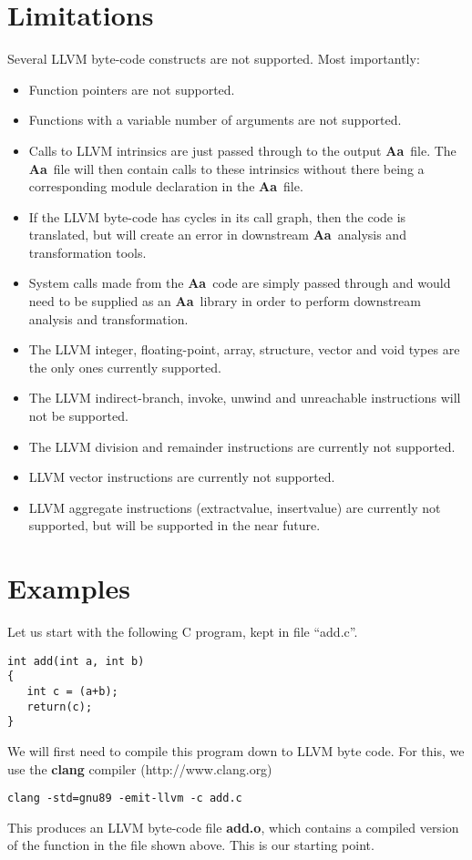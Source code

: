 \documentclass{article}
\newcommand{\Aa}{{\bf Aa}~}
\begin{document}
\section{Limitations}

Several LLVM byte-code constructs are not supported.  Most 
importantly:
\begin{itemize}
\item Function pointers are not supported.
\item Functions with a variable number of arguments are not 
supported.
\item Calls to LLVM intrinsics are just passed through to the
output \Aa file.  The \Aa file will then contain calls
to these intrinsics without there being a corresponding
module declaration in the \Aa file.
\item If the LLVM byte-code has cycles in its call graph,
then the code is translated, but will create an error
in downstream \Aa analysis and transformation tools.
\item System calls made from the \Aa code are simply
passed through and would need to be supplied as an
\Aa library in order to perform downstream analysis and
transformation.
\item The LLVM integer, floating-point, array, structure,
vector and void types are the only ones currently supported.
\item The LLVM indirect-branch, invoke, unwind and unreachable
instructions will not be supported.
\item The LLVM division and remainder instructions are currently
not supported. 
\item LLVM vector instructions are currently not supported.
\item LLVM aggregate instructions (extractvalue, insertvalue)
are currently not supported, but will be supported in the
near future.
\end{itemize}

\section{Examples}

Let us start with the following C program, kept
in file ``add.c''.
\begin{verbatim}
int add(int a, int b)
{
   int c = (a+b);
   return(c);
}
\end{verbatim}

We will first need to compile this program down to 
LLVM byte code.  For this, we use the {\bf clang}
compiler (http://www.clang.org)
\begin{verbatim}
clang -std=gnu89 -emit-llvm -c add.c
\end{verbatim}
This produces an LLVM byte-code file {\bf add.o},
which contains a compiled version of the function
in the file shown above.
This is our starting point.
\end{document}
